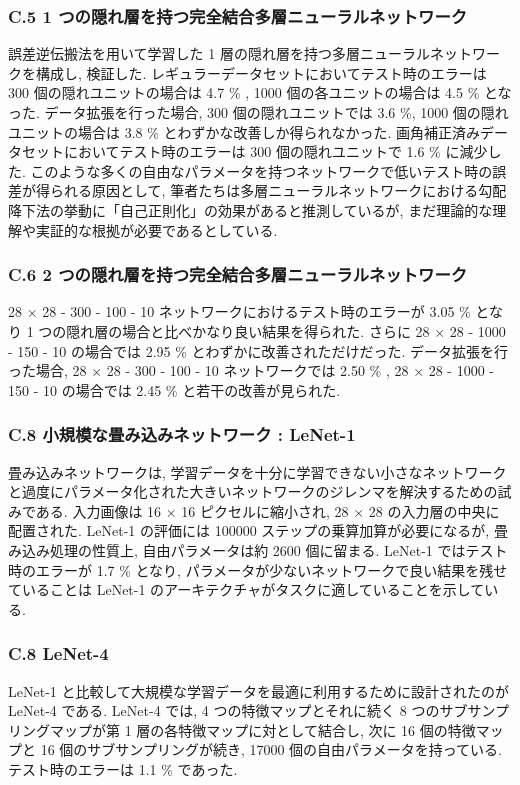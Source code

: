 \documentclass[twocolumn]{jarticle}     %
\begin{document}
\subsubsection{C.5 1 つの隠れ層を持つ完全結合多層ニューラルネットワーク}

誤差逆伝搬法を用いて学習した 1 層の隠れ層を持つ多層ニューラルネットワークを構成し, 検証した.
レギュラーデータセットにおいてテスト時のエラーは 300 個の隠れユニットの場合は  4.7 \% , 1000 個の各ユニットの場合は 4.5 \% となった.
データ拡張を行った場合, 300 個の隠れユニットでは 3.6 \%, 1000 個の隠れユニットの場合は 3.8 \% とわずかな改善しか得られなかった.
画角補正済みデータセットにおいてテスト時のエラーは 300 個の隠れユニットで 1.6 \% に減少した.
このような多くの自由なパラメータを持つネットワークで低いテスト時の誤差が得られる原因として, 筆者たちは多層ニューラルネットワークにおける勾配降下法の挙動に「自己正則化」の効果があると推測しているが, まだ理論的な理解や実証的な根拠が必要であるとしている.

\subsubsection{C.6 2 つの隠れ層を持つ完全結合多層ニューラルネットワーク}
28 × 28 - 300 - 100 - 10 ネットワークにおけるテスト時のエラーが 3.05 \% となり 1 つの隠れ層の場合と比べかなり良い結果を得られた. さらに 28 × 28 - 1000 - 150 - 10 の場合では 2.95 \% とわずかに改善されただけだった. データ拡張を行った場合, 28 × 28 - 300 - 100 - 10 ネットワークでは 2.50 \% , 28 × 28 - 1000 - 150 - 10 の場合では 2.45 \% と若干の改善が見られた.

\subsubsection{C.8 小規模な畳み込みネットワーク : LeNet-1}
畳み込みネットワークは, 学習データを十分に学習できない小さなネットワークと過度にパラメータ化された大きいネットワークのジレンマを解決するための試みである.
入力画像は 16 × 16 ピクセルに縮小され, 28 × 28 の入力層の中央に配置された. LeNet-1 の評価には 100000 ステップの乗算加算が必要になるが, 畳み込み処理の性質上, 自由パラメータは約 2600 個に留まる.
LeNet-1 ではテスト時のエラーが 1.7 \% となり, パラメータが少ないネットワークで良い結果を残せていることは LeNet-1 のアーキテクチャがタスクに適していることを示している.

\subsubsection{C.8 LeNet-4}
LeNet-1 と比較して大規模な学習データを最適に利用するために設計されたのが LeNet-4 である. LeNet-4 では, 4 つの特徴マップとそれに続く 8 つのサブサンプリングマップが第 1 層の各特徴マップに対として結合し, 次に 16 個の特徴マップと 16 個のサブサンプリングが続き, 17000 個の自由パラメータを持っている. テスト時のエラーは 1.1 \% であった.
\end{document}
